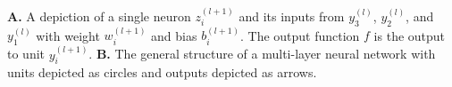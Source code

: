 \textbf{A.} A depiction of a single neuron $z_i^{(l+1)}$ and its inputs from $y_3^{(l)}$, $y_2^{(l)}$, and $y_1^{(l)}$ with weight $w_i^{(l+1)}$ and bias $b_i^{(l+1)}$. The output function $f$ is the output to unit $y_i^{(l+1)}$. \textbf{B.} The general structure of a multi-layer neural network with units depicted as circles and outputs depicted as arrows. \cite{JMLR:v15:srivastava14a}
